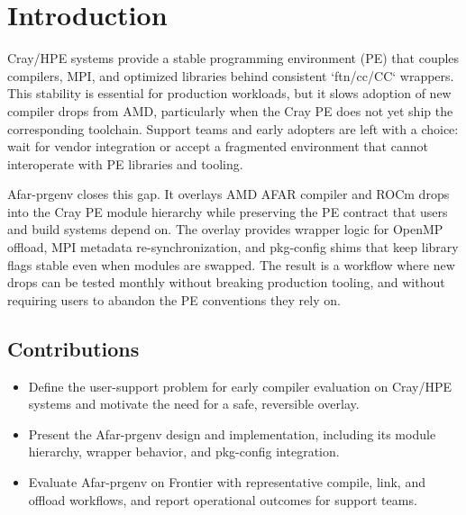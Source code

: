 \section{Introduction}
\label{sec:intro}
Cray/HPE systems provide a stable programming environment (PE) that couples
compilers, MPI, and optimized libraries behind consistent `ftn/cc/CC` wrappers.
This stability is essential for production workloads, but it slows adoption of
new compiler drops from AMD, particularly when the Cray PE does not yet ship
the corresponding toolchain. Support teams and early adopters are left with a
choice: wait for vendor integration or accept a fragmented environment that
cannot interoperate with PE libraries and tooling.

Afar-prgenv closes this gap.\cite{AfarPrgenv2025} It overlays AMD AFAR compiler and ROCm drops into
the Cray PE module hierarchy while preserving the PE contract that users and
build systems depend on. The overlay provides wrapper logic for OpenMP offload,
MPI metadata re-synchronization, and pkg-config shims that keep library flags
stable even when modules are swapped. The result is a workflow where new drops
can be tested monthly without breaking production tooling, and without requiring
users to abandon the PE conventions they rely on.

\subsection{Contributions}
\label{sec:contrib}
\begin{itemize}
  \item Define the user-support problem for early compiler evaluation on
  Cray/HPE systems and motivate the need for a safe, reversible overlay.
  \item Present the Afar-prgenv design and implementation, including its module
  hierarchy, wrapper behavior, and pkg-config integration.
  \item Evaluate Afar-prgenv on Frontier with representative compile, link,
  and offload workflows, and report operational outcomes for support teams.
\end{itemize}
